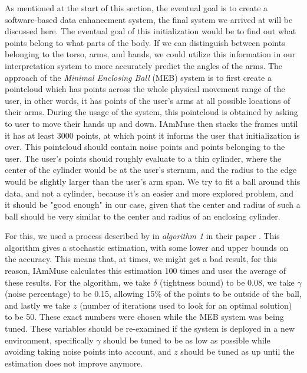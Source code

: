 As mentioned at the start of this section, the eventual goal is to create a software-based data enhancement system, the final system we arrived at will be discussed here.
The eventual goal of this initialization would be to find out what points belong to what parts of the body.
If we can distinguish between points belonging to the torso, arms, and hands, we could utilize this information in our interpretation system to more accurately predict the angles of the arms.
The approach of the \textit{Minimal Enclosing Ball} (MEB) system is to first create a pointcloud which has points across the whole physical movement range of the user, in other words, it has points of the user's arms at all possible locations of their arms.
During the usage of the system, this pointcloud is obtained by asking to user to move their hands up and down.
IAmMuse then stacks the frames until it has at least 3000 points, at which point it informs the user that initialization is over.
This pointcloud should contain noise points and points belonging to the user.
The user's points should roughly evaluate to a thin cylinder, where the center of the cylinder would be at the user's sternum, and the radius to the edge would be slightly larger than the user's arm span.
We try to fit a ball around this data, and not a cylinder, because it's an easier and more explored problem, and it should be "good enough" in our case, given that the center and radius of such a ball should be very similar to the center and radius of an enclosing cylinder.


For this, we used a process described by \citeauthor{ding2020sublineartimeframeworkgeometric} in \textit{algorithm 1} in their paper \cite{ding2020sublineartimeframeworkgeometric}.
This algorithm gives a stochastic estimation, with some lower and upper bounds on the accuracy.
This means that, at times, we might get a bad result, for this reason, IAmMuse calculates this estimation 100 times and uses the average of these results.
For the algorithm, we take $\delta$ (tightness bound) to be 0.08, we take $\gamma$ (noise percentage) to be 0.15, allowing 15\% of the points to be outside of the ball, and lastly we take $z$ (number of iterations used to look for an optimal solution) to be 50.
These exact numbers were chosen while the MEB system was being tuned.
These variables should be re-examined if the system is deployed in a new environment, specifically $\gamma$ should be tuned to be as low as possible while avoiding taking noise points into account, and $z$ should be tuned as up until the estimation does not improve anymore.


